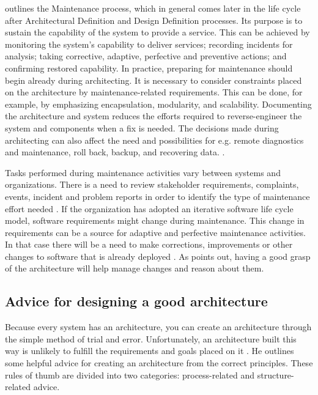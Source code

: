 \documentclass[utf8,english]{gradu3}
\begin{document}
\textcite{IEEE12207} outlines the Maintenance process, which in general comes later in the
life cycle after Architectural Definition and Design Definition processes. Its
purpose is to sustain the capability of the system to provide a service. This
can be achieved by monitoring the system's capability to deliver services;
recording incidents for analysis; taking corrective, adaptive, perfective and
preventive actions; and confirming restored capability. In practice, preparing
for maintenance should begin already during architecting. It is necessary to
consider constraints placed on the architecture by maintenance-related
requirements. This can be done, for example, by emphasizing encapsulation,
modularity, and scalability. Documenting the architecture and system reduces the
efforts required to reverse-engineer the system and components when a fix is
needed. The decisions made during architecting can also affect the need and
possibilities for e.g. remote diagnostics and maintenance, roll back, backup,
and recovering data. \parencite[95-96]{IEEE12207}.

Tasks performed during maintenance activities vary between systems and
organizations. There is a need to review stakeholder requirements, complaints,
events, incident and problem reports in order to identify the type of
maintenance effort needed \parencite{IEEE12207}. If the organization has adopted an
iterative software life cycle model, software requirements might change during
maintenance. This change in requirements can be a source for adaptive and
perfective maintenance activities. In that case there will be a need to make
corrections, improvements or other changes to software that is already deployed
\parencite[97]{IEEE12207}. As \textcite[32]{Bass1998} points out, having a good grasp of the
architecture will help manage changes and reason about them.


\subsection{Advice for designing a good architecture}

Because every system has an architecture, you can create an architecture through
the simple method of trial and error. Unfortunately, an architecture built this
way is unlikely to fulfill the requirements and goals placed on it \parencite[24]{Bass1998}.
He outlines some helpful advice for creating an architecture from the
correct principles. These rules of thumb are divided into two categories:
process-related and structure-related advice.
\end{document}
